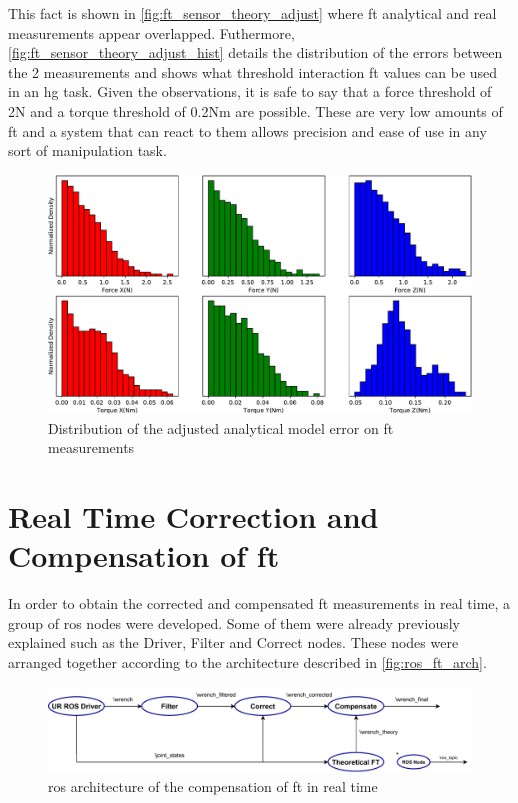 \par This fact is shown in \autoref{fig:ft_sensor_theory_adjust} where \ac{ft} analytical and real measurements appear overlapped. Futhermore, \autoref{fig:ft_sensor_theory_adjust_hist} details the distribution of the errors between the 2 measurements and shows what threshold interaction \ac{ft} values can be used in an \ac{hg} task. Given the observations, it is safe to say that a force threshold of 2N and a torque threshold of 0.2Nm are possible. These are very low amounts of \ac{ft} and a system that can react to them allows precision and ease of use in any sort of manipulation task.

\begin{figure}[h]
    \centering
    \includegraphics[width=0.8\linewidth]{figs/chp3/ft_sensor_theory_adjust_hist.pdf}
    \caption{Distribution of the adjusted analytical model error on \ac{ft} measurements}
    \label{fig:ft_sensor_theory_adjust_hist}
\end{figure}

\section{Real Time Correction and Compensation of \ac{ft}}

\par In order to obtain the corrected and compensated \ac{ft} measurements in real time, a group of \ac{ros} nodes were developed. Some of them were already previously explained such as the Driver, Filter and Correct nodes. These nodes were arranged together according to the architecture described in \autoref{fig:ros_ft_arch}.

\begin{figure}[h]
    \centering
    \includegraphics[width=\linewidth]{figs/chp3/ros_ft_comp_arch.pdf}
    \caption{\ac{ros} architecture of the compensation of \ac{ft} in real time}
    \label{fig:ros_ft_arch}
\end{figure}

